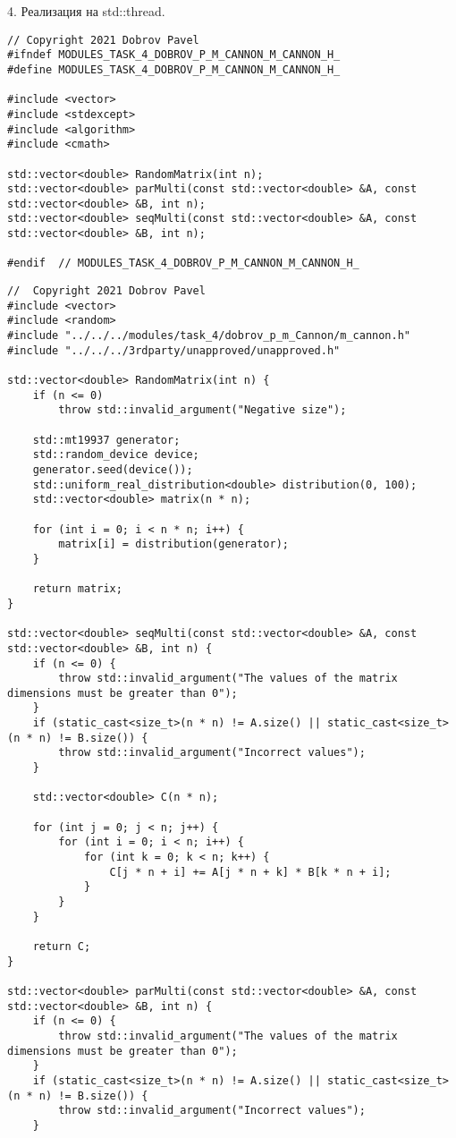 \documentclass{report}
\begin{document}
\par 4. Реализация на std::thread.
\begin{lstlisting}
// Copyright 2021 Dobrov Pavel
#ifndef MODULES_TASK_4_DOBROV_P_M_CANNON_M_CANNON_H_
#define MODULES_TASK_4_DOBROV_P_M_CANNON_M_CANNON_H_

#include <vector>
#include <stdexcept>
#include <algorithm>
#include <cmath>

std::vector<double> RandomMatrix(int n);
std::vector<double> parMulti(const std::vector<double> &A, const std::vector<double> &B, int n);
std::vector<double> seqMulti(const std::vector<double> &A, const std::vector<double> &B, int n);

#endif  // MODULES_TASK_4_DOBROV_P_M_CANNON_M_CANNON_H_
\end{lstlisting}
\begin{lstlisting}
//  Copyright 2021 Dobrov Pavel
#include <vector>
#include <random>
#include "../../../modules/task_4/dobrov_p_m_Cannon/m_cannon.h"
#include "../../../3rdparty/unapproved/unapproved.h"

std::vector<double> RandomMatrix(int n) {
    if (n <= 0)
        throw std::invalid_argument("Negative size");

    std::mt19937 generator;
    std::random_device device;
    generator.seed(device());
    std::uniform_real_distribution<double> distribution(0, 100);
    std::vector<double> matrix(n * n);

    for (int i = 0; i < n * n; i++) {
        matrix[i] = distribution(generator);
    }

    return matrix;
}

std::vector<double> seqMulti(const std::vector<double> &A, const std::vector<double> &B, int n) {
    if (n <= 0) {
        throw std::invalid_argument("The values of the matrix dimensions must be greater than 0");
    }
    if (static_cast<size_t>(n * n) != A.size() || static_cast<size_t>(n * n) != B.size()) {
        throw std::invalid_argument("Incorrect values");
    }

    std::vector<double> C(n * n);

    for (int j = 0; j < n; j++) {
        for (int i = 0; i < n; i++) {
            for (int k = 0; k < n; k++) {
                C[j * n + i] += A[j * n + k] * B[k * n + i];
            }
        }
    }

    return C;
}

std::vector<double> parMulti(const std::vector<double> &A, const std::vector<double> &B, int n) {
    if (n <= 0) {
        throw std::invalid_argument("The values of the matrix dimensions must be greater than 0");
    }
    if (static_cast<size_t>(n * n) != A.size() || static_cast<size_t>(n * n) != B.size()) {
        throw std::invalid_argument("Incorrect values");
    }


\end{lstlisting}
\end{document}
